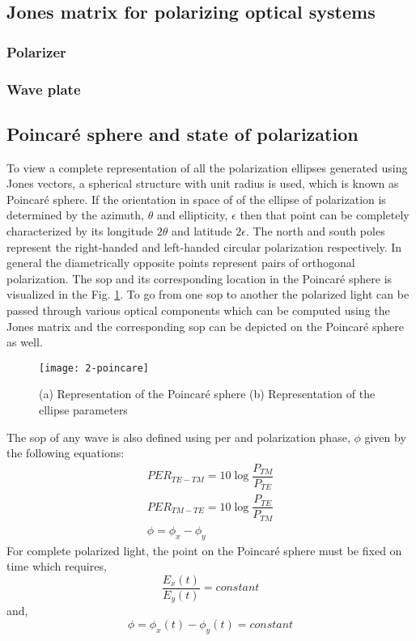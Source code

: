 \documentclass[../report.tex]{subfiles}
\begin{document}
		\subsection{Jones matrix for polarizing optical systems}
			\subsubsection{Polarizer}
			\subsubsection{Wave plate}
			
		\subsection{Poincaré sphere and state of polarization}
To view a complete representation of all the polarization ellipses generated using Jones vectors, a spherical structure with unit radius is used, which is known as Poincaré sphere. If the orientation in space of of the ellipse of polarization is determined by the azimuth, $\theta$ and ellipticity, $\epsilon$ then that point can be completely characterized by its longitude $2\theta$ and latitude $2\epsilon$. The north and south poles represent the right-handed and left-handed circular polarization respectively. In general the diametrically opposite points represent pairs of orthogonal polarization. The \gls{sop} and its corresponding location in the Poincaré sphere is visualized in the Fig. \ref{fig:2_poincare}. To go from one \gls{sop} to another the polarized light can be passed through various optical components which can be computed using the Jones matrix and the corresponding \gls{sop} can be depicted on the Poincaré sphere as well.     
\begin{figure}[H]
	\centering
	\texttt{[image: 2-poincare]}
	\caption{(a) Representation of the Poincaré sphere (b) Representation of the ellipse parameters \cite{flossmann_stokes_2006}}
	\label{fig:2_poincare}
\end{figure}
\noindent The \gls{sop} of any wave is also defined using \gls{per} and polarization phase, $\phi$ given by the following equations:
\begin{equation}\label{eq:wave_sop}
\begin{aligned}
PER_{TE-TM} = 10\log \dfrac {P_{TM}} {P_{TE}}\\
PER_{TM-TE} = 10\log \dfrac {P_{TE}} {P_{TM}}\\
\phi =\phi _{x}-\phi _{y}
\end{aligned}
\end{equation}
For complete polarized light, the point on the Poincaré sphere must be fixed on time which requires,
\begin{equation}\label{eq:polarization_condition_1}
\dfrac {E_{x}\left( t\right) } {E_{y}\left( t\right) }=constant
\end{equation}
and,
\begin{equation}\label{eq:polarization_condition_2}
\phi = \phi_{x}(t) - \phi_{y}(t)=constant
\end{equation}
\end{document}
